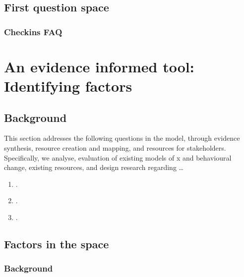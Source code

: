 \documentclass[
]{book}
\providecommand{\tightlist}{%
  \setlength{\itemsep}{0pt}\setlength{\parskip}{0pt}}
\begin{document}
\hypertarget{synthesis-checkins}{%
\section{First question space}\label{synthesis-checkins}}

\label{fig:synthesis-checkin}

\hypertarget{checkins-faq}{%
\subsection{Checkins FAQ}\label{checkins-faq}}

\label{fig:synthesis-checkin-faq}

\hypertarget{factors}{%
\chapter{An evidence informed tool: Identifying factors}\label{factors}}

\hypertarget{background}{%
\section{Background}\label{background}}

This section addresses the following questions in the model, through evidence synthesis, resource creation and mapping, and resources for stakeholders. Specifically, we analyse, evaluation of existing models of x and behavioural change, existing resources, and design research regarding \ldots{}

\begin{enumerate}
\def\labelenumi{\arabic{enumi}.}
\tightlist
\item
  .
\item
  .
\item
  .
\end{enumerate}

\hypertarget{factors-in-the-space}{%
\section{Factors in the space}\label{factors-in-the-space}}

\hypertarget{background-1}{%
\subsection{Background}\label{background-1}}
\end{document}
